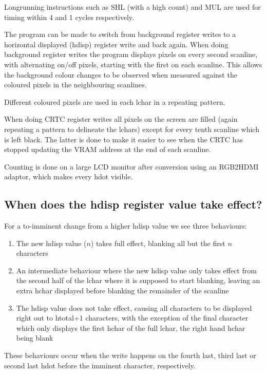 \documentclass[a4paper,10pt]{amsart}
\begin{document}
Longrunning instructions such as SHL (with a high count) and MUL are used for
timing within 4 and 1 cycles respectively.

The program can be made to switch from background register writes to a
horizontal displayed (hdisp) register write and back again. When doing
background register writes the program displays pixels on every second
scanline, with alternating on/off pixels, starting with the first on each
scanline. This allows the background colour changes to be observed when
measured against the coloured pixels in the neighbouring scanlines.

Different coloured pixels are used in each lchar in a repeating pattern.

When doing CRTC register writes all pixels on the screen are filled (again
repeating a pattern to delineate the lchars) except for every tenth scanline
which is left black. The latter is done to make it easier to see when the
CRTC has stopped updating the VRAM address at the end of each scanline.

Counting is done on a large LCD monitor after conversion using an RGB2HDMI
adaptor, which makes every hdot visible.

\subsection{When does the hdisp register value take effect?}

For a to-imminent change from a higher hdisp value we see three behaviours:

\begin{enumerate}
\item The new hdisp value ($n$) takes full effect, blanking all but the
first $n$ characters
\item An intermediate behaviour where the new hdisp value only takes effect
from the second half of the lchar where it is supposed to start blanking, leaving
an extra hchar displayed before blanking the remainder of the scanline
\item The hdisp value does not take effect, causing all characters to be
displayed right out to htotal$+1$ characters, with the exception
of the final character which only displays the first hchar of the full lchar,
the right hand hchar being blank
\end{enumerate}

These behaviours occur when the write happens on the fourth last, third last or
second last hdot before the imminent character, respectively.
\end{document}
